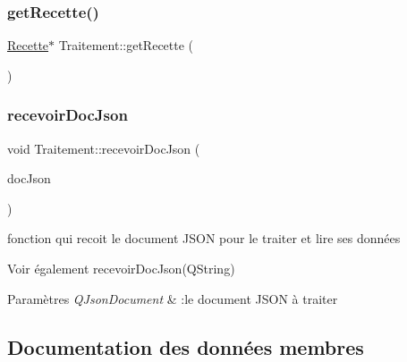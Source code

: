 \mbox{\label{classTraitement_aba3c99b92a3b6d429e4479294267af9d}} 
\subsubsection{\texorpdfstring{get\+Recette()}{getRecette()}}
{\footnotesize\ttfamily \hyperlink{classRecette}{Recette}$\ast$ Traitement\+::get\+Recette (\begin{DoxyParamCaption}{ }\end{DoxyParamCaption})\hspace{0.3cm}{\ttfamily [inline]}}

\mbox{\label{classTraitement_aa66e6be8e21062472a6c1e9a95097dc5}} 
\subsubsection{\texorpdfstring{recevoir\+Doc\+Json}{recevoirDocJson}}
{\footnotesize\ttfamily void Traitement\+::recevoir\+Doc\+Json (\begin{DoxyParamCaption}\item[{Q\+Json\+Document}]{doc\+Json }\end{DoxyParamCaption})\hspace{0.3cm}{\ttfamily [slot]}}



fonction qui recoit le document J\+S\+ON pour le traiter et lire ses données 

\begin{DoxySeeAlso}{Voir également}
recevoir\+Doc\+Json(\+Q\+String) 
\end{DoxySeeAlso}

\begin{DoxyParams}{Paramètres}
{\em Q\+Json\+Document} & \+:le document J\+S\+ON à traiter \\
\hline
\end{DoxyParams}


\subsection{Documentation des données membres}
\mbox{\label{classTraitement_ac7e6ff3bfc54975b1c8831a2ad8fc9a4}} 
